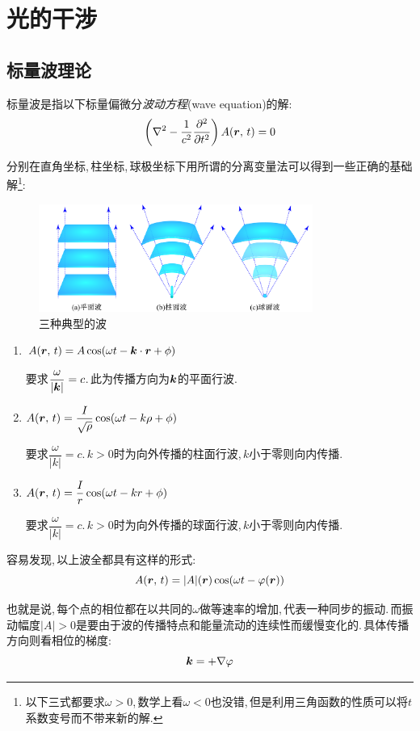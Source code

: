 \chapter{光的干涉}


\section{标量波理论}
标量波是指以下标量偏微分\emph{波动方程}(wave equation)的解:
\[\left(\nabla^2 -\frac{1}{c^2}\frac{\partial^2}{\partial t^2}\right)A(\boldsymbol{r},\,t)=0\]

分别在直角坐标,\,柱坐标,\,球极坐标下用所谓的分离变量法可以得到一些正确的基础解\footnote{以下三式都要求$\omega >0$,\,数学上看$\omega<0$也没错,\,但是利用三角函数的性质可以将$t$系数变号而不带来新的解.}:
\begin{figure}[H]
\centering
\includegraphics[width=0.8\textwidth]{image/14-1-1.png}
\caption{三种典型的波}
\end{figure}

\begin{enumerate}
	\item $A(\boldsymbol{r},\,t)=A\cos(\omega t-\boldsymbol{k}\cdot \boldsymbol{r}+\phi)$

	要求$\dfrac{\omega}{|\boldsymbol{k}|}=c$.\,此为传播方向为$\boldsymbol{k}$的平面行波.
	\item $A(\boldsymbol{r},\,t)=\dfrac{I}{\sqrt{\rho}}\cos(\omega t-k\rho+\phi)$

	要求$\dfrac{\omega}{|k|}=c$.\,$k>0$时为向外传播的柱面行波,\,$k$小于零则向内传播.
	\item $A(\boldsymbol{r},\,t)=\dfrac{I}{r}\cos(\omega t-kr+\phi)$

	要求$\dfrac{\omega}{|k|}=c$.\,$k>0$时为向外传播的球面行波,\,$k$小于零则向内传播.
\end{enumerate}

容易发现,\,以上波全都具有这样的形式:
\[A(\boldsymbol{r},\,t)=|A|(\boldsymbol{r})\cos(\omega t-\varphi(\boldsymbol{r}))\]

也就是说,\,每个点的相位都在以共同的$\omega$做等速率的增加,\,代表一种同步的振动.\,而振动幅度$|A|>0$是要由于波的传播特点和能量流动的连续性而缓慢变化的.\,具体传播方向则看相位的梯度:
\[\boldsymbol{k}=+\nabla \varphi\]

